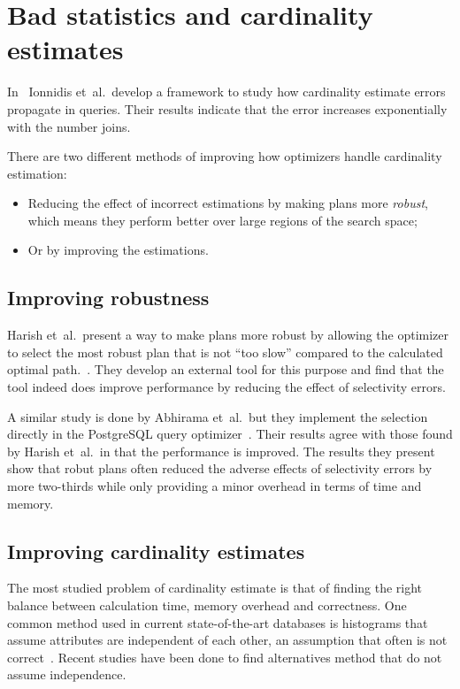 \section{Bad statistics and cardinality estimates}
In~\cite{ioannidis_1991_propagation_otpoeitsojr} Ionnidis  et\ al.\ develop a framework to study how cardinality estimate errors propagate in queries. Their results indicate that the error increases exponentially with the number joins.

There are two different methods of improving how optimizers handle cardinality estimation:
\begin{itemize}
    \item Reducing the effect of incorrect estimations by making plans more \textit{robust}, which means they perform better over large regions of the search space;
    \item Or by improving the estimations.
\end{itemize}

\subsection{Improving robustness}
Harish et\ al.\ present a way to make plans more robust by allowing the optimizer to select the most robust plan that is not ``too slow'' compared to the calculated optimal path.~\cite{harish_2008_identifying_irptpdr}. They develop an external tool for this purpose and find that the tool indeed does improve performance by reducing the effect of selectivity errors.

A similar study is done by Abhirama et\ al.\ but they implement the selection directly in the PostgreSQL query optimizer~\cite{abhirama_2010_stability_otsopcatcops}. Their results agree with those found by Harish  et\ al.\ in that the performance is improved. The results they present show that robut plans often reduced the adverse effects of selectivity errors by more two-thirds while only providing a minor overhead in terms of time and memory.

\subsection{Improving cardinality estimates}
The most studied problem of cardinality estimate is that of finding the right balance between calculation time, memory overhead and correctness. One common method used in current state-of-the-art databases is histograms that assume attributes are independent of each other, an assumption that often is not correct~\cite{ioannidis_2003_history_thoha}. Recent studies have been done to find alternatives method that do not assume independence.

